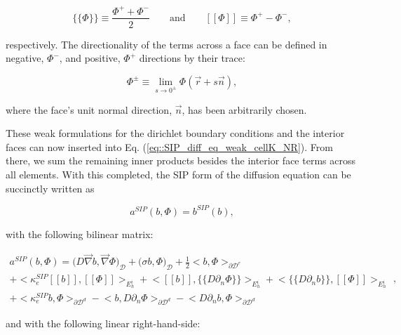 \begin{equation}
\label{eq::solution_mean_and_jump}
\{\!\{  \Phi \}\!\} \equiv \frac{\Phi^+ + \Phi^-}{2} \qquad \text{and} \qquad [\![   \Phi ]\!] \equiv \Phi^+ - \Phi^- ,
\end{equation}

\noindent respectively. The directionality of the terms across a face can be defined in negative, $\Phi^-$, and positive, $\Phi^+$ directions by their trace:

\begin{equation}
\label{eq::solution_trace}
\Phi^{\pm} \equiv \lim_{s \rightarrow 0^{\pm}} \Phi (\vec{r} + s \vec{n}),
\end{equation}

\noindent where the face's unit normal direction, $\vec{n}$, has been arbitrarily chosen.

These weak formulations for the dirichlet boundary conditions and the interior faces can now inserted into Eq. (\ref{eq::SIP_diff_eq_weak_cellK_NR}). From there, we sum the remaining inner products besides the interior face terms across all elements. With this completed, the SIP form of the diffusion equation can be succinctly written as

\begin{equation}
a^{SIP}( b, \Phi) = b^{SIP}(b),
\label{eq::SIP_weak_form}
\end{equation}

\noindent with the following bilinear matrix:

\begin{equation}
\label{eq::SIP_bilinear_form}
\begin{aligned}
a^{SIP}( b, \Phi)  = \Big(  D \vec{\nabla}  b , \vec{\nabla} \Phi  \Big)_{\mathcal{D}} + \Big(  \sigma   b ,  \Phi  \Big)_{\mathcal{D}}  +  \frac{1}{2} \Big<    b , \Phi \Big>_{\partial \mathcal{D}^r}   \\
+  \Big< \kappa_e^{SIP} [\![   b ]\!] , [\![  \Phi ]\!]\Big>_{E_h^i} + \Big<  [\![   b ]\!] , \{\!\{  D \partial_n \Phi \}\!\}\Big>_{E_h^i}  + \Big< \{\!\{  D \partial_n  b \}\!\} , [\![ \Phi ]\!]\Big>_{E_h^i} \\
+ \Big< \kappa_e^{SIP}   b ,   \Phi \Big>_{\partial \mathcal{D}^d} - \Big<   b  ,  D \partial_n \Phi \Big>_{\partial \mathcal{D}^d} - \Big<   D 				\partial_n  b , \Phi \Big>_{\partial \mathcal{D}^d}  
\end{aligned} ,
\end{equation}

\noindent and with the following linear right-hand-side:

